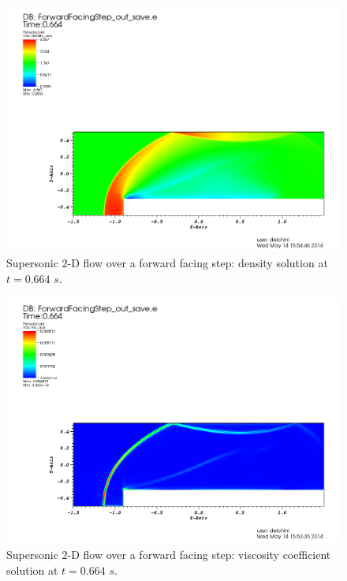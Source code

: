 \begin{figure}[H]
\centering
\includegraphics[width=\textwidth]{figures/FFSDensityEqualTo0p664.png}
\caption{Supersonic $2$-D flow over a forward facing step: density solution at $t=0.664$ $s$.}
\label{fig:2d_ffs_rho_0664}
\end{figure}
%
\begin{figure}[H]
\centering
\includegraphics[width=\textwidth]{figures/FFSViscEqualTo0p664.png}
\caption{Supersonic $2$-D flow over a forward facing step: viscosity coefficient solution at $t=0.664$ $s$.}
\label{fig:2d_ffs_visc_0664}
\end{figure}
%
